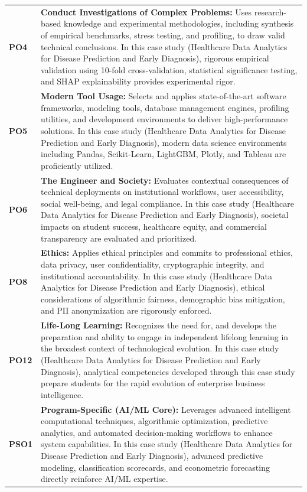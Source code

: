 {\begin{longtable}{@{}>{\centering\arraybackslash}p{1.8cm} p{13.2cm}@{}}
    \addlinespace
\textbf{PO4} & \textbf{Conduct Investigations of Complex Problems:} Uses research-based knowledge and experimental methodologies, including synthesis of empirical benchmarks, stress testing, and profiling, to draw valid technical conclusions. In this case study (Healthcare Data Analytics for Disease Prediction and Early Diagnosis), rigorous empirical validation using 10-fold cross-validation, statistical significance testing, and SHAP explainability provides experimental rigor. \\
    \addlinespace
\textbf{PO5} & \textbf{Modern Tool Usage:} Selects and applies state-of-the-art software frameworks, modeling tools, database management engines, profiling utilities, and development environments to deliver high-performance solutions. In this case study (Healthcare Data Analytics for Disease Prediction and Early Diagnosis), modern data science environments including Pandas, Scikit-Learn, LightGBM, Plotly, and Tableau are proficiently utilized. \\
    \addlinespace
\textbf{PO6} & \textbf{The Engineer and Society:} Evaluates contextual consequences of technical deployments on institutional workflows, user accessibility, social well-being, and legal compliance. In this case study (Healthcare Data Analytics for Disease Prediction and Early Diagnosis), societal impacts on student success, healthcare equity, and commercial transparency are evaluated and prioritized. \\
    \addlinespace
\textbf{PO8} & \textbf{Ethics:} Applies ethical principles and commits to professional ethics, data privacy, user confidentiality, cryptographic integrity, and institutional accountability. In this case study (Healthcare Data Analytics for Disease Prediction and Early Diagnosis), ethical considerations of algorithmic fairness, demographic bias mitigation, and PII anonymization are rigorously enforced. \\
    \addlinespace
\textbf{PO12} & \textbf{Life-Long Learning:} Recognizes the need for, and develops the preparation and ability to engage in independent lifelong learning in the broadest context of technological evolution. In this case study (Healthcare Data Analytics for Disease Prediction and Early Diagnosis), analytical competencies developed through this case study prepare students for the rapid evolution of enterprise business intelligence. \\
    \addlinespace
\textbf{PSO1} & \textbf{Program-Specific (AI/ML Core):} Leverages advanced intelligent computational techniques, algorithmic optimization, predictive analytics, and automated decision-making workflows to enhance system capabilities. In this case study (Healthcare Data Analytics for Disease Prediction and Early Diagnosis), advanced predictive modeling, classification scorecards, and econometric forecasting directly reinforce AI/ML expertise. \\

\end{longtable}}
